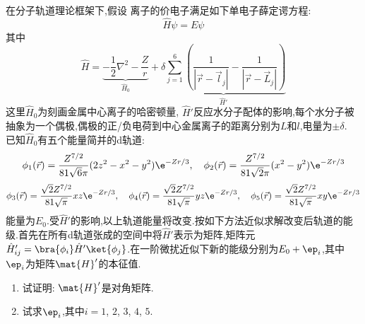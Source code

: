 \documentclass{ctexart}
\begin{document}
\begin{homework}[14.]
    在分子轨道理论框架下,假设 离子的价电子满足如下单电子薛定谔方程:
    \[\hat{H}\psi=E\psi\]
    其中
    \[\hat{H}=\underbrace{-\dfrac12\nabla^2-\dfrac Zr}_{\hat{H}_0}+\underbrace{\delta\sum_{j=1}^{6}\left(\dfrac{1}{\left|\vec{r}-\vec{l}_j\right|}-\dfrac{1}{\left|\vec{r}-\vec{L}_j\right|}\right)}_{\hat{H}'}\]
    这里$\hat{H}_0$为刻画金属中心离子的哈密顿量, $\hat{H}'$反应水分子配体的影响,每个水分子被抽象为一个偶极,偶极的正/负电荷到中心金属离子的距离分别为$L$和$l$,电量为$\pm\delta$.\\
    \indent 已知$\hat{H}_0$有五个能量简并的d轨道:
    \[\phi_1(\vec{r})=\dfrac{Z^{7/2}}{81\sqrt{6}\pi}(2z^2-x^2-y^2)\e^{-Zr/3},\quad\phi_2(\vec{r})=\dfrac{Z^{7/2}}{81\sqrt{2}\pi}(x^2-y^2)\e^{-Zr/3}\]
    \[\phi_3(\vec{r})=\dfrac{\sqrt2Z^{7/2}}{81\sqrt{\pi}}xz\e^{-Zr/3},\quad\phi_4(\vec{r})=\dfrac{\sqrt2Z^{7/2}}{81\sqrt{\pi}}yz\e^{-Zr/3},\quad\phi_5(\vec{r})=\dfrac{\sqrt2Z^{7/2}}{81\sqrt{\pi}}xy\e^{-Zr/3}\]
    能量为$E_0$.受$\hat{H}'$的影响,以上轨道能量将改变.按如下方法近似求解改变后轨道的能级.首先在所有d轨道张成的空间中将$\hat{H}'$表示为矩阵,矩阵元$\hat{H}'_{ij}=\bra{\phi_i}\hat{H}'\ket{\phi_j}$.在一阶微扰近似下新的能级分别为$E_0+\ep_i$,其中$\ep_i$为矩阵$\mat{H}'$的本征值.
    \begin{enumerate}[label=\tbf{(\alph*)}]
        \item 试证明: $\mat{H}'$是对角矩阵.
        \item 试求$\ep_i$,其中$i=1$, $2$, $3$, $4$, $5$.
    \end{enumerate}
\end{homework}
\end{document}

